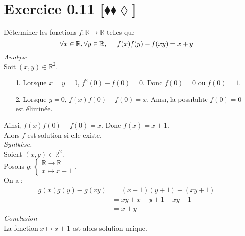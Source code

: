 \documentclass[10pt]{article}
\begin{document}
\section*{Exercice 0.11 [$\blacklozenge\blacklozenge\lozenge$]}
\begin{tcolorbox}[enhanced, width=6in, center, size=fbox, fontupper=\large, drop shadow southwest]
    Déterminer les fonctions $f: \mathbb{R} \rightarrow \mathbb{R}$ telles que 
    \begin{equation*}
        \forall{x\in\mathbb{R},\forall{y\in\mathbb{R}}, \hspace{0.5cm} f(x)f(y) - f(xy) = x + y}
    \end{equation*}
    \emph{Analyse.}\\
    Soit $(x,y)\in\mathbb{R}^2$.
    \begin{itemize}
        \item[1.] Lorsque $x=y=0$, $f^2(0)-f(0)=0$. Donc $f(0) = 0$ ou $f(0) = 1$.
        \item[2.] Lorsque $y=0$, $f(x)f(0)-f(0)=x$. Ainsi, la possibilité $f(0)=0$ est éliminée.
    \end{itemize}
    Ainsi, $f(x)f(0)-f(0)=x$. Donc $f(x)=x+1$.\\
    Alors $f$ est solution si elle existe.\\[0.25cm]
    \emph{Synthèse.}\\
    Soient $(x,y)\in\mathbb{R}^2$.\\
    Posons $g: \begin{cases}\mathbb{R}\rightarrow\mathbb{R}\\x\mapsto{x+1}\end{cases}$.\\
    On a :
    \begin{align*}
        g(x)g(y)-g(xy)
        &=(x+1)(y+1)-(xy+1)\\
        &=xy+x+y+1-xy-1\\
        &=x+y
    \end{align*}
    \emph{Conclusion.}\\
    La fonction $x\mapsto x+1$ est alors solution unique.
\end{tcolorbox}
\end{document}
